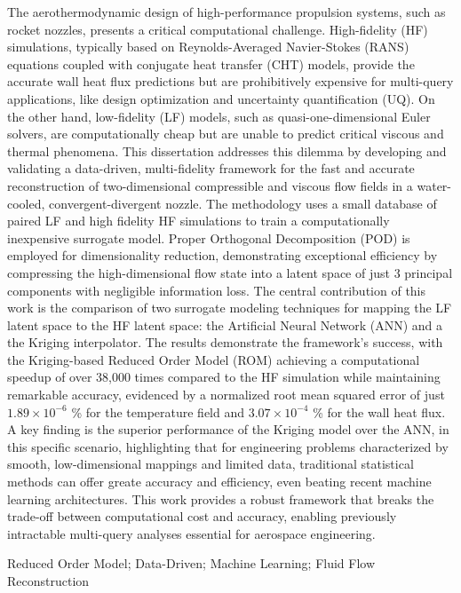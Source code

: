 \documentclass[tg, EN]{ufabcFHZh_tg}
\begin{document}
\begin{foreignabstract}
The aerothermodynamic design of high-performance propulsion systems, such as rocket nozzles, presents a critical computational challenge. High-fidelity (HF) simulations, typically based on Reynolds-Averaged Navier-Stokes (RANS) equations coupled with conjugate heat transfer (CHT) models, provide the accurate wall heat flux predictions but are prohibitively expensive for multi-query applications, like design optimization and uncertainty quantification (UQ). On the other hand, low-fidelity (LF) models, such as quasi-one-dimensional Euler solvers, are computationally cheap but are unable to predict critical viscous and thermal phenomena. This dissertation addresses this dilemma by developing and validating a data-driven, multi-fidelity framework for the fast and accurate reconstruction of two-dimensional compressible and viscous flow fields in a water-cooled, convergent-divergent nozzle. The methodology uses a small database of paired LF and high fidelity HF simulations to train a computationally inexpensive surrogate model. Proper Orthogonal Decomposition (POD) is employed for dimensionality reduction, demonstrating exceptional efficiency by compressing the high-dimensional flow state into a latent space of just 3 principal components with negligible information loss. The central contribution of this work is the comparison of two surrogate modeling techniques for mapping the LF latent space to the HF latent space: the Artificial Neural Network (ANN) and a the Kriging interpolator. The results demonstrate the framework's success, with the Kriging-based Reduced Order Model (ROM) achieving a computational speedup of over 38,000 times compared to the HF simulation while maintaining remarkable accuracy, evidenced by a normalized root mean squared error of just $1.89\times10^{-6}$ \% for the temperature field and $3.07\times10^{-4}$ \% for the wall heat flux. A key finding is the superior performance of the Kriging model over the ANN, in this specific scenario, highlighting that for engineering problems characterized by smooth, low-dimensional mappings and limited data, traditional statistical methods can offer greate accuracy and efficiency, even beating recent machine learning architectures. This work provides a robust framework that breaks the trade-off between computational cost and accuracy, enabling previously intractable multi-query analyses essential for aerospace engineering.
\end{foreignabstract}
\keywordeng
{Reduced Order Model};
{Data-Driven};
{Machine Learning};
{Fluid Flow Reconstruction}
\end{document}
